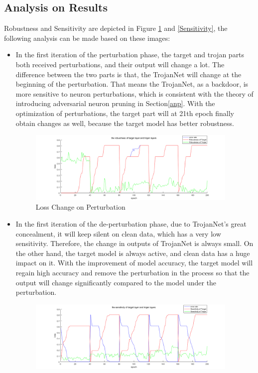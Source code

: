 \documentclass[english,version-2022-01]{uzl-thesis}
\begin{document}
\subsection{Analysis on Results}
Robustness and Sensitivity are depicted in Figure \ref{Robustness} and \ref{Sensitivity}, the following analysis can be made based on these images: 
\begin{itemize}
    \item[1.] In the first iteration of the perturbation phase, the target and trojan parts both received perturbations, and their output will change a lot. The difference between the two parts is that, the TrojanNet will change at the beginning of the perturbation. That means the TrojanNet, as a backdoor, is more sensitive to neuron perturbations, which is consistent with the theory of introducing adversarial neuron pruning in Section\ref{anp}. With the optimization of perturbations, the target part will at 21th epoch finally obtain changes as well, because the target model has better robustness.
    \begin{figure}[htpb]
          \centering
          \includegraphics[width=0.95\textwidth]{pic/Robustness.png}
          \caption{Loss Change on Perturbation}
          \label{Robustness}
    \end{figure}
    \item[2.] In the first iteration of the de-perturbation phase, due to TrojanNet's great concealment, it will keep silent on clean data, which has a very low sensitivity. Therefore, the change in outputs of TrojanNet is always small. On the other hand, the target model is always active, and clean data has a huge impact on it. With the improvement of model accuracy, the target model will regain high accuracy and remove the perturbation in the process so that the output will change significantly compared to the model under the perturbation.
    \begin{figure}[htpb]
          \centering
          \includegraphics[width=0.95\textwidth]{pic/Sensitivity.png}

\end{figure}
\end{itemize}
\end{document}
